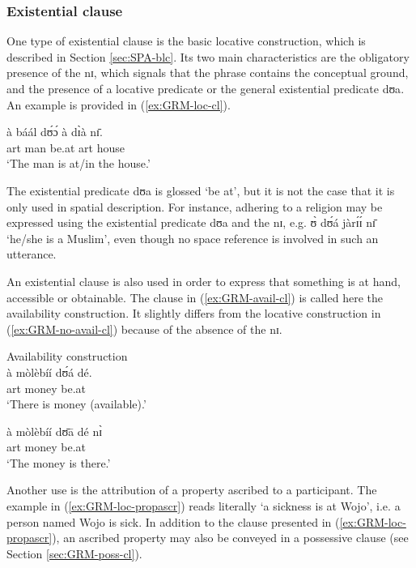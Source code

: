 
\subsubsection{Existential clause} 
\label{sec:GRM-loc-cl}

One type of existential clause is the basic  locative construction, which is
described in Section \ref{sec:SPA-blc}. Its
two main characteristics are the obligatory presence of the  {\sls 
nɪ},  which signals that the phrase contains the conceptual ground, and the
presence of a locative predicate or the general existential predicate {\sls 
dʊa}. An example is provided in (\ref{ex:GRM-loc-cl}).

\ea\label{ex:GRM-loc-cl}
\gll à báál dʊ́ɔ́ à dɪ̀à nɪ̄.\\
{\sc art}  man be.at {\sc art} house {\postp}\\
 \glt  `The man is at/in the house.'
\z

The existential predicate {\sls dʊa} is glossed `be at', but it is not the case
that it is only used in spatial description. For instance,  adhering to a
religion may be expressed using the existential predicate {\sls dʊa} and the
 {\sls nɪ}, e.g.  {\sls ʊ̀ dʊ́á jàrɪ́ɪ́ nɪ̄} `he/she is a 
Muslim', 
even
though no space reference is involved in such an utterance. 

An existential clause is also used in order to express that something is at
hand, accessible or obtainable. The clause in (\ref{ex:GRM-avail-cl}) is called
here 
the availability construction. It slightly differs from the
locative
construction in (\ref{ex:GRM-no-avail-cl}) because of  the absence of the
{\sls nɪ}.

\ea\label{ex:GRM-avail-vs-loc}

\ea\label{ex:GRM-avail-cl}{\rm Availability construction}\\

\gll à mòlèbíí dʊ́á dé.\\
{\sc art}  money be.at {\dem}\\
\glt  `There is money (available).'

\ex\label{ex:GRM-no-avail-cl}
\gll à mòlèbíí dʊ̄ā dé nɪ̀\\
{\sc art}  money be.at {\dem}  {\postp}\\
\glt `The money is there.'

\z 
 \z


Another use is the attribution of a property ascribed to a participant. The
example in (\ref{ex:GRM-loc-propascr}) reads literally `a sickness is at Wojo', 
i.e. a person named Wojo is sick.  In addition to the clause presented in
(\ref{ex:GRM-loc-propascr}), an ascribed property may also be conveyed in a
possessive clause (see Section \ref{sec:GRM-poss-cl}). 


